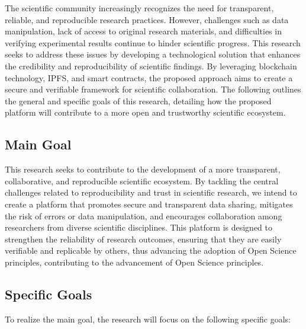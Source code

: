 \documentclass[final]{rc-book-2.14}
\begin{document}
The scientific community increasingly recognizes the need for transparent, reliable, and reproducible research practices. However, challenges such as data manipulation, lack of access to original research materials, and difficulties in verifying experimental results continue to hinder scientific progress. This research seeks to address these issues by developing a technological solution that enhances the credibility and reproducibility of scientific findings. By leveraging blockchain technology, IPFS, and smart contracts, the proposed approach aims to create a secure and verifiable framework for scientific collaboration. The following outlines the general and specific goals of this research, detailing how the proposed platform will contribute to a more open and trustworthy scientific ecosystem.

\subsection{Main Goal}
\label{subsec:introduction:goal:main}

\begin{citeverbatim}
    This research seeks to contribute to the development of a more transparent, collaborative, and reproducible scientific ecosystem. By tackling the central challenges related to reproducibility and trust in scientific research, we intend to create a platform that promotes secure and transparent data sharing, mitigates the risk of errors or data manipulation, and encourages collaboration among researchers from diverse scientific disciplines. This platform is designed to strengthen the reliability of research outcomes, ensuring that they are easily verifiable and replicable by others, thus advancing the adoption of Open Science principles, contributing to the advancement of Open Science principles.

\end{citeverbatim}


\subsection{Specific Goals}
\label{subsec:introduction:goal:specific}

To realize the main goal, the research will focus on the following specific goals:
\end{document}
